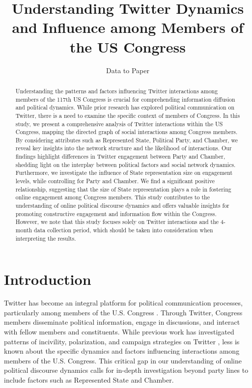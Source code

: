 \documentclass[11pt]{article}
\title{Understanding Twitter Dynamics and Influence among Members of the US Congress}
\author{Data to Paper}
\begin{document}
\maketitle
\begin{abstract}
Understanding the patterns and factors influencing Twitter interactions among members of the 117th US Congress is crucial for comprehending information diffusion and political dynamics. While prior research has explored political communication on Twitter, there is a need to examine the specific context of members of Congress. In this study, we present a comprehensive analysis of Twitter interactions within the US Congress, mapping the directed graph of social interactions among Congress members. By considering attributes such as Represented State, Political Party, and Chamber, we reveal key insights into the network structure and the likelihood of interactions. Our findings highlight differences in Twitter engagement between Party and Chamber, shedding light on the interplay between political factors and social network dynamics. Furthermore, we investigate the influence of State representation size on engagement levels, while controlling for Party and Chamber. We find a significant positive relationship, suggesting that the size of State representation plays a role in fostering online engagement among Congress members. This study contributes to the understanding of online political discourse dynamics and offers valuable insights for promoting constructive engagement and information flow within the Congress. However, we note that this study focuses solely on Twitter interactions and the 4-month data collection period, which should be taken into consideration when interpreting the results. 
\end{abstract}
\section*{Introduction}

Twitter has become an integral platform for political communication processes, particularly among members of the U.S. Congress \cite{Aragn2013CommunicationDI, Huberman2008SocialNT, Carlisle2013IsSM, Theocharis2020TheDO, Hemphill2013WhatsCD, Straus2013CommunicatingI1}. Through Twitter, Congress members disseminate political information, engage in discussions, and interact with fellow members and constituents. While previous work has investigated patterns of incivility, polarization, and campaign strategies on Twitter \cite{Theocharis2020TheDO, Garca2015IdeologicalAT, Hua2020CharacterizingTU, Bail2019AssessingTR}, less is known about the specific dynamics and factors influencing interactions among members of the U.S. Congress. This critical gap in our understanding of online political discourse dynamics calls for in-depth investigation beyond party lines to include factors such as Represented State and Chamber.
\end{document}
